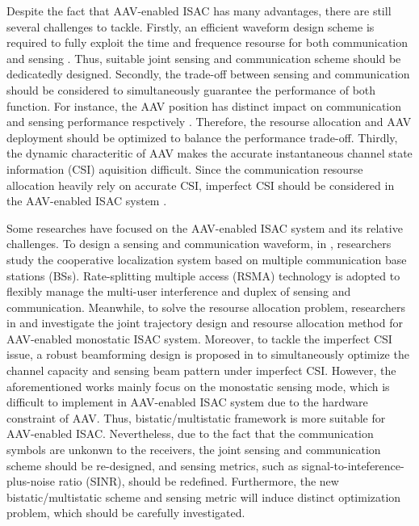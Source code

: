 \documentclass[twocolumn,journal]{IEEEtran}
\begin{document}
Despite the fact that AAV-enabled ISAC has many advantages, there are still several challenges to tackle. Firstly, an efficient waveform design scheme is required to fully exploit the time and frequence resourse for both communication and sensing \cite{chenJoint2023b}. Thus, suitable joint sensing and communication scheme should be dedicatedly designed. Secondly, the trade-off between sensing and communication should be considered to simultaneously guarantee the performance of both function. For instance, the AAV position has distinct impact on communication and sensing performance respctively \cite{huCollaborative2025}. Therefore, the resourse allocation and AAV deployment should be optimized to balance the performance trade-off. 
Thirdly, the dynamic characteritic of AAV makes the accurate instantaneous channel state information (CSI) aquisition difficult. Since the communication resourse allocation heavily rely on accurate CSI, imperfect CSI should be considered in the AAV-enabled ISAC system \cite{maoUAVAssisted2025}.

Some researches have focused on the AAV-enabled ISAC system and its relative challenges. To design a sensing and communication waveform, in \cite{xuRateSplitting2021a}, researchers study the cooperative localization system based on multiple communication base stations (BSs). Rate-splitting multiple access (RSMA) technology is adopted to flexibly manage the multi-user interference and duplex of sensing and communication. Meanwhile, to solve the resourse allocation problem, researchers in \cite{mengUAVEnabled2023} and \cite{jingISAC2024} investigate the joint trajectory design and resourse allocation method for AAV-enabled monostatic ISAC system. Moreover, to tackle the imperfect CSI issue, a robust beamforming design is proposed in \cite{lyuDualRobust2024} to simultaneously optimize the channel capacity and sensing beam pattern under imperfect CSI. However, the aforementioned works mainly focus on the monostatic sensing mode, which is difficult to implement in AAV-enabled ISAC system due to the hardware constraint of AAV. Thus, bistatic/multistatic framework is more suitable for AAV-enabled ISAC. Nevertheless, due to the fact that the communication symbols are unkonwn to the receivers, the joint sensing and communication scheme should be re-designed, and sensing metrics, such as signal-to-inteference-plus-noise ratio (SINR), should be redefined. Furthermore, the new bistatic/multistatic scheme and sensing metric will induce distinct optimization problem, which should be carefully investigated. 
\end{document}
